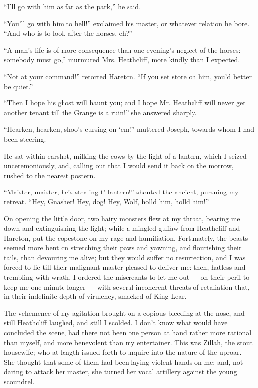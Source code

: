 \par “I'll go with him as far as the park,” he said.
\par “You'll go with him to hell!” exclaimed his master, or whatever relation he bore. “And who is to look after the horses, eh?”
\par “A man's life is of more consequence than one evening's neglect of the horses: somebody must go,” murmured Mrs. Heathcliff, more kindly than I expected.
\par “Not at your command!” retorted Hareton. “If you set store on him, you'd better be quiet.”
\par “Then I hope his ghost will haunt you; and I hope Mr. Heathcliff will never get another tenant till the Grange is a ruin!” she answered sharply.
\par “Hearken, hearken, shoo's cursing on ‘em!” muttered Joseph, towards whom I had been steering.
\par He sat within earshot, milking the cows by the light of a lantern, which I seized unceremoniously, and, calling out that I would send it back on the morrow, rushed to the nearest postern.
\par “Maister, maister, he's stealing t' lantern!” shouted the ancient, pursuing my retreat. “Hey, Gnasher! Hey, dog! Hey, Wolf, holld him, holld him!”
\par On opening the little door, two hairy monsters flew at my throat, bearing me down and extinguishing the light; while a mingled guffaw from Heathcliff and Hareton, put the copestone on my rage and humiliation. Fortunately, the beasts seemed more bent on stretching their paws and yawning, and flourishing their tails, than devouring me alive; but they would suffer no resurrection, and I was forced to lie till their malignant master pleased to deliver me: then, hatless and trembling with wrath, I ordered the miscreants to let me out — on their peril to keep me one minute longer — with several incoherent threats of retaliation that, in their indefinite depth of virulency, smacked of King Lear.
\par The vehemence of my agitation brought on a copious bleeding at the nose, and still Heathcliff laughed, and still I scolded. I don't know what would have concluded the scene, had there not been one person at hand rather more rational than myself, and more benevolent than my entertainer. This was Zillah, the stout housewife; who at length issued forth to inquire into the nature of the uproar. She thought that some of them had been laying violent hands on me; and, not daring to attack her master, she turned her vocal artillery against the young scoundrel.
